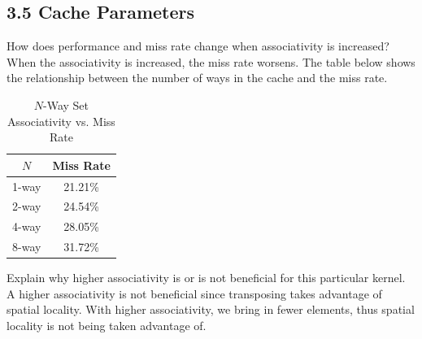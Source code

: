 \documentclass[11pt]{article}
\begin{document}
\subsection*{3.5 Cache Parameters}
\begin{Parts}
	\Part How does performance and miss rate change when associativity is increased? \\
	When the associativity is increased, the miss rate worsens. The table below shows the relationship between the number of ways in the cache and the miss rate.

	\begin{table}[ht]
		\caption{$N$-Way Set Associativity vs. Miss Rate} %
		\centering %
		\begin{tabular}{c c} %
			\hline\hline %
			$N$   & Miss Rate \\ [0.5ex] %
			\hline %
			1-way & 21.21\%   \\
			2-way & 24.54\%   \\
			4-way & 28.05\%   \\
			8-way & 31.72\%   \\
			[1ex] %
			\hline %
		\end{tabular}
		\label{table:nonlin} %
	\end{table}


	\Part Explain why higher associativity is or is not beneficial for this particular kernel. \\
	A higher associativity is not beneficial since transposing takes advantage of spatial locality. With higher associativity, we bring in fewer elements, thus spatial locality is not being taken advantage of.
\end{Parts}
\newpage

\end{document}
